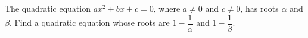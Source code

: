 The quadratic equation $ax^2+bx+c=0$, where $a\ne0$ and $c\ne0$, has roots $\alpha$ and $\beta$. Find a quadratic equation whose roots are $1-\dfrac1\alpha$ and $1-\dfrac1\beta$.
